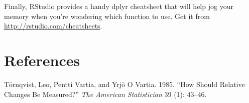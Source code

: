 Finally, RStudio provides a handy dplyr cheatsheet that will help jog
your memory when you're wondering which function to use. Get it from
\url{http://rstudio.com/cheatsheets}.

\section*{References}\label{references}

\hypertarget{refs}{}
\hypertarget{ref-tornqvist:1985}{}
Törnqvist, Leo, Pentti Vartia, and Yrjö O Vartia. 1985. ``How Should
Relative Changes Be Measured?'' \emph{The American Statistician} 39 (1):
43--46.
